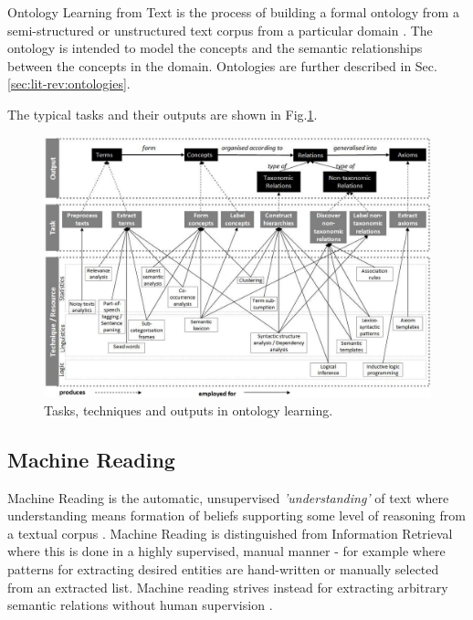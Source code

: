 \documentclass[a4paper]{report}
\begin{document}
Ontology Learning from Text is the process of building a formal ontology from a semi-structured or unstructured text corpus from a particular domain \citep[p.3-7]{Cimiano06}.
The ontology is intended to model the concepts and the semantic relationships between the concepts in the domain.
Ontologies are further described in Sec.\ref{sec:lit-rev:ontologies}.

The typical tasks and their outputs are shown in Fig.\ref{fig:output-task-technique}.

\begin{figure}
  \includegraphics[width=\textwidth]{graphics/output-task-technique-WongLiuBennamoun.png}
  \caption{Tasks, techniques and outputs in ontology learning. \cite{Wong2009PhD}}
  \label{fig:output-task-technique}
\end{figure}


\subsection{Machine Reading}
\label{subsec:background:machine_reading}

Machine Reading is the automatic, unsupervised \emph{'understanding'} of text where understanding means formation of beliefs supporting some level of reasoning from a textual corpus \citep{EtzioniEtAll06MachineReading}.
Machine Reading is distinguished from Information Retrieval where this is done in a highly supervised, manual manner - for example where patterns for extracting desired entities are hand-written or manually selected from an extracted list.
Machine reading strives instead for extracting arbitrary semantic relations without human supervision \citep{EtzioniEtAll06MachineReading}.
\end{document}
